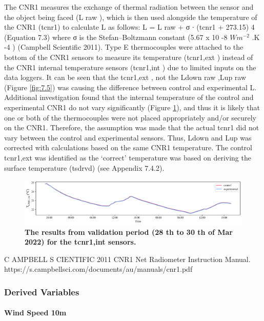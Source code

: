 \documentclass[final,3p,times,authoryear]{elsarticle}
\begin{document}
The CNR1 measures the exchange of thermal radiation between the sensor and the
object being faced (L raw ), which is then used alongside the temperature of the CNR1
(\gls{tcnr1}) to calculate L as follows:
L = L raw + σ ∙ (\gls{tcnr1} + 273.15) 4
(Equation 7.3)
where σ is the Stefan–Boltzmann constant (5.67 x 10 -8 $Wm^{-2}$ .K -4 ) (Campbell Scientific
2011).
Type E thermocouples were attached to the bottom of the CNR1 sensors to measure its
temperature (\gls{tcnr1},ext ) instead of the CNR1 internal temperature sensors (\gls{tcnr1},int ) due
to limited inputs on the data loggers. It can be seen that the \gls{tcnr1},ext , not the \gls{Ldown} raw ,\gls{Lup} raw
(Figure \ref{fig:7.5}) was causing the difference between control and experimental L.
Additional investigation found that the internal temperature of the control and
experimental CNR1 do not vary significantly (Figure \ref{fig:7.6}), and thus it is likely that one
or both of the thermocouples were not placed appropriately and/or securely on the
CNR1. Therefore, the assumption was made that the actual \gls{tcnr1} did not vary between
the control and experimental sensors. Thus, \gls{Ldown} and \gls{Lup} was corrected with calculations
based on the same CNR1 temperature.
The control \gls{tcnr1},ext was identified as the `correct' temperature was based on deriving
the surface temperature (\gls{tsdrvd}) (see Appendix 7.4.2).

\begin{figure}
\centering
\includegraphics[trim={0 0 0 0},clip,scale=1.0]{pict022.png}
\caption{\bf The results from validation period (28 th to 30 th of Mar 2022) for the \gls{tcnr1},int sensors.}
 \label{fig:7.6}
\end{figure}

C AMPBELL S CIENTIFIC 2011 CNR1 Net Radiometer Instruction Manual.
https://s.campbellsci.com/documents/au/manuals/cnr1.pdf


\subsubsection{Derived Variables}\label{sec:appendix7.4}
\paragraph{Wind Speed 10m}\label{sec:appendix7.4.1}
\end{document}
